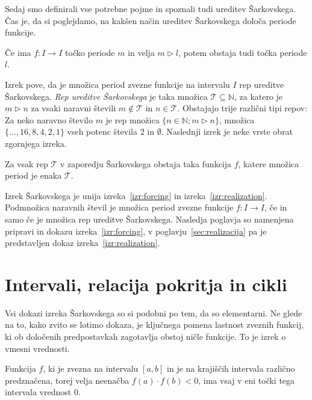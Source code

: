 \documentclass[mat2]{fmfdelo}
\newcommand{\N}{\mathbb N}
\begin{document}
Sedaj smo definirali vse potrebne pojme in spoznali tudi ureditev Šarkovskega. Čas je, da si poglejdamo, na kakšen način ureditev Šarkovskega določa periode funkcije.

\begin{izrek}\label{izr:forcing}
Če ima $f : I \to I$ točko periode $m$ in velja $ m \triangleright l$, potem obstaja tudi točka periode $l$.
\end{izrek}
Izrek pove, da je množica period zvezne funkcije na intervalu $I$ rep ureditve Šarkovskega. \emph{Rep ureditve Šarkovskega} je taka množica $\mathcal{T} \subseteq \N$, za katero je $m \triangleright n$ za  vsaki naravni števili $m \notin \mathcal{T}$ in $n \in \mathcal{T}$. Obstajajo trije različni tipi repov:  Za neko naravno število $m$ je rep množica $\{n \in \N; m \triangleright n\}$, množica $\{\dots, 16, 8, 4, 2, 1\}$ vseh potenc števila 2 in $\emptyset$.
Naslednji izrek je neke vrste obrat zgornjega izreka.

\begin{izrek}\label{izr:realization}
Za vsak rep $\mathcal{T}$ v zaporedju Šarkovskega obstaja taka funkcija $f$, katere množica period je enaka $\mathcal{T}$.
\end{izrek}

Izrek Šarkovskega je unija izreka~\ref{izr:forcing} in izreka~\ref{izr:realization}. Podmnožica naravnih števil je množica period zvezne funkcije $f:I \to I$, če in samo če je množica rep ureditve Šarkovskega. Nasledja poglavja so namenjena pripravi in dokazu izreka~\ref{izr:forcing}, v poglavju~\ref{sec:realizacija} pa je predstavljen dokaz izreka~\ref{izr:realization}.

\section{Intervali, relacija pokritja in cikli}%
Vsi dokazi izreka Šarkovskega so si podobni po tem, da so elementarni. Ne glede na to, kako zvito se lotimo dokaza, je ključnega pomena lastnost zveznih funkcij, ki ob določenih predpostavkah zagotavlja obstoj ničle funkcije. To je izrek o vmesni vrednosti.

\begin{izrek}\label{izr:iovv}
Funkcija $f$, ki je zvezna na intervalu $[a, b]$ in je na krajiščih intervala različno predznačena, torej velja neenačba $f(a)\cdot f(b) < 0$, ima vsaj v eni točki tega intervala vrednost 0.
\end{izrek}
\end{document}
